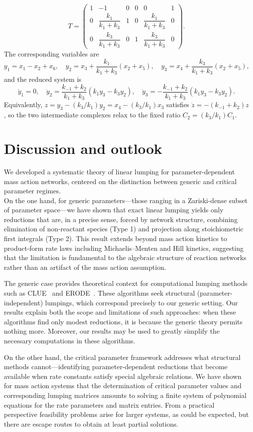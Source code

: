\documentclass{article}
\begin{document}
\begin{enumerate}
\[
T=
\begin{pmatrix}
1&-1&0&0&0&1\\
0&\dfrac{k_1}{k_1+k_3}&1&0&\dfrac{k_1}{k_1+k_3}&0\\
0&\dfrac{k_3}{k_1+k_3}&0&1&\dfrac{k_3}{k_1+k_3}&0
\end{pmatrix}.
\]
The corresponding variables are
\[
y_1=x_1-x_2+x_6,
\quad
 y_2=x_3+\frac{k_1}{k_1+k_3}(x_2+x_5),
\quad
 y_3=x_4+\frac{k_3}{k_1+k_3}(x_2+x_5),
\]
and the reduced system is
\[
\dot y_1=0,
\quad
\dot y_2=\frac{k_{-1}+k_2}{k_1+k_3}(k_1y_3-k_3y_2),
\quad
\dot y_3=-\frac{k_{-1}+k_2}{k_1+k_3}(k_1y_3-k_3y_2).
\]
Equivalently, $z=y_3-(k_3/k_1)y_2=x_4-(k_3/k_1)x_3$ satisfies $\dot z=-(k_{-1}+k_2)z$, so the two intermediate complexes relax to the fixed ratio $C_2=(k_3/k_1)C_1$.
\end{enumerate}


\section{Discussion and outlook}
We developed a systematic theory of linear lumping for parameter-dependent mass 
action networks, centered on the distinction between generic and critical parameter regimes. \\
On the one hand, for generic parameters---those ranging in a Zariski-dense subset of parameter space---we 
have shown that exact linear lumping yields only reductions that are, in a precise sense, 
forced by network structure, combining elimination of non-reactant species (Type 1) and projection 
along stoichiometric first integrals (Type 2). This result extends beyond mass 
action kinetics to product-form rate laws including Michaelis--Menten and Hill kinetics, 
suggesting that the limitation is fundamental to the algebraic structure of reaction 
networks rather than an artifact of the mass action assumption.

The generic case provides theoretical context for computational lumping methods such as 
CLUE~\cite{OVPT2021} and ERODE~\cite{CardelliTTV2017}. These algorithms seek structural 
(parameter-independent) lumpings, which correspond precisely to our generic setting. Our 
results explain both the scope and limitations of such approaches: when these algorithms 
find only modest reductions, it is because the generic theory permits nothing more. Moreover, our results may be used to greatly simplify the necessary computations in these algorithms.

On the other hand, the critical parameter framework addresses what structural methods cannot---identifying 
parameter-dependent reductions that become available when rate constants satisfy special 
algebraic relations. We have shown for mass action systems that the determination of critical parameter values and corresponding lumping matrices amounts to solving a finite system of polynomial equations for the rate parameters and matrix entries. From a practical perspective feasibility problems arise for larger systems, as could be expected, but there are escape routes to obtain at least partial solutions. 
\end{document}
